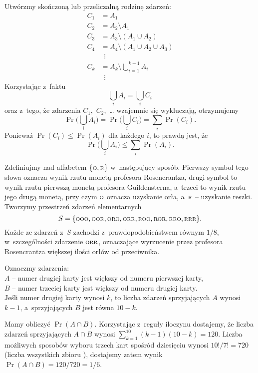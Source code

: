 
\exercise{} %
Utwórzmy skończoną lub przeliczalną rodzinę zdarzeń:
\begin{align*}
	C_1 &= A_1 \\
	C_2 &= A_2\setminus A_1 \\
	C_3 &= A_3\setminus(A_1\cup A_2) \\
	C_4 &= A_4\setminus(A_1\cup A_2\cup A_3) \\
	& \,\,\,\vdots \\
	C_k &= A_k\setminus\bigcup_{i=1}^{k-1}A_i \\
	& \,\,\,\vdots
\end{align*}
Korzystając z~faktu
\[
	\bigcup_iA_i = \bigcup_iC_i
\]
oraz z~tego, że zdarzenia $C_1$,~$C_2$,~\dots{} wzajemnie się wykluczają, otrzymujemy
\[
	\Pr\biggl(\bigcup_iA_i\biggr) = \Pr\biggl(\bigcup_iC_i\biggr) = \sum_i\Pr(C_i).
\]
Ponieważ $\Pr(C_i)\le\Pr(A_i)$ dla każdego $i$, to prawdą jest, że
\[
	\Pr\biggl(\bigcup_iA_i\biggr) \le \sum_i\Pr(A_i).
\]

\exercise{} %
Zdefiniujmy  nad alfabetem $\{{\scriptstyle\rm O},{\scriptstyle\rm R}\}$ w~następujący sposób. Pierwszy symbol tego słowa oznacza wynik rzutu monetą profesora Rosencrantza, drugi symbol to wynik rzutu pierwszą monetą profesora Guildensterna, a~trzeci to wynik rzutu jego drugą monetą, przy czym $\scriptstyle\rm O$ oznacza uzyskanie orła, a~$\scriptstyle\rm R$ -- uzyskanie reszki. Tworzymy przestrzeń zdarzeń elementarnych
\[
	S = \{{\scriptstyle\rm OOO},{\scriptstyle\rm OOR},{\scriptstyle\rm ORO},{\scriptstyle\rm ORR},{\scriptstyle\rm ROO},{\scriptstyle\rm ROR},{\scriptstyle\rm RRO},{\scriptstyle\rm RRR}\}.
\]
Każde ze zdarzeń z~$S$ zachodzi z~prawdopodobieństwem równym $1/8$, w~szczególności zdarzenie $\scriptstyle\rm ORR$, oznaczające wyrzucenie przez profesora Rosencrantza większej ilości orłów od przeciwnika.

\exercise{} %
Oznaczmy zdarzenia: \\
\hspace*\parindent$A$ -- numer drugiej karty jest większy od numeru pierwszej karty, \\
\hspace*\parindent$B$ -- numer trzeciej karty jest większy od numeru drugiej karty. \\
Jeśli numer drugiej karty wynosi $k$, to liczba zdarzeń sprzyjających $A$ wynosi $k-1$, a~sprzyjających $B$ jest równa $10-k$.

Mamy obliczyć $\Pr(A\cap B)$. Korzystając z~reguły iloczynu dostajemy, że liczba zdarzeń sprzyjających $A\cap B$ wynosi $\sum_{k=1}^{10}(k-1)(10-k)=120$. Liczba możliwych sposobów wyboru trzech kart spośród dziesięciu wynosi $10!/7!=720$ (liczba wszystkich  zbioru ), dostajemy zatem wynik $\Pr(A\cap B)=120/720=1/6$.

